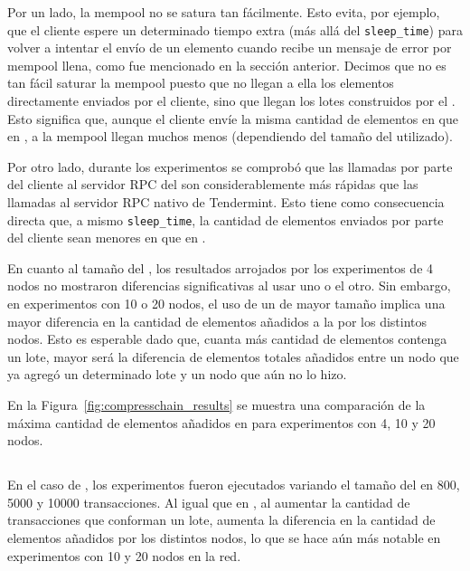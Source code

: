 Por un lado, la mempool no se satura tan fácilmente. Esto evita, por ejemplo, que el cliente espere un determinado tiempo
extra (más allá del \texttt{sleep\_time}) para volver a intentar el envío de un elemento cuando recibe un mensaje de error por mempool llena,
como fue mencionado en la sección anterior.
Decimos que no es tan fácil saturar la mempool puesto que no llegan a ella los elementos directamente enviados por el cliente,
sino que llegan los lotes construidos por el \collector.
Esto significa que, aunque el cliente envíe la misma cantidad de elementos en \vanilla que en \compresschain, a la mempool llegan
muchos menos (dependiendo del tamaño del \collector utilizado).

Por otro lado, durante los experimentos se comprobó que las llamadas por parte del cliente al servidor RPC del \collector
son considerablemente más rápidas que las llamadas al servidor RPC nativo de Tendermint.
Esto tiene como consecuencia directa que, a mismo \texttt{sleep\_time}, la cantidad de elementos enviados por parte del cliente
sean menores en \vanilla que en \compresschain.


En cuanto al tamaño del \collector, los resultados arrojados por los experimentos de 4 nodos no mostraron diferencias significativas
al usar uno o el otro.
Sin embargo, en experimentos con 10 o 20 nodos, el uso de un \collector de mayor tamaño implica una mayor diferencia en la cantidad
de elementos añadidos a la \setchain por los distintos nodos.
Esto es esperable dado que, cuanta más cantidad de elementos contenga un lote, mayor será la diferencia de elementos totales añadidos
entre un nodo que ya agregó un determinado lote y un nodo que aún no lo hizo.

En la Figura~\ref{fig:compresschain_results} se muestra una comparación de la máxima cantidad de elementos añadidos en \compresschain para experimentos con
4, 10 y 20 nodos.


\subsection{\hashchain}

En el caso de \hashchain, los experimentos fueron ejecutados variando el tamaño del \collector en 800, 5000 y 10000 transacciones.
Al igual que en \compresschain, al aumentar la cantidad de transacciones que conforman un lote, aumenta la diferencia en la cantidad
de elementos añadidos por los distintos nodos, lo que se hace aún más notable en experimentos con 10 y 20 nodos en la red.

